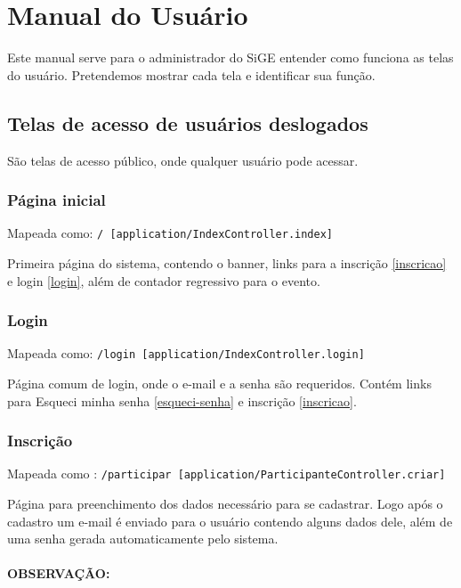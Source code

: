 \section{Manual do Usuário}

Este manual serve para o administrador do SiGE entender como funciona as
telas do usuário. Pretendemos mostrar cada tela e identificar sua
função.

\subsection{Telas de acesso de usuários deslogados}

São telas de acesso público, onde qualquer usuário pode acessar.

\subsubsection{Página inicial \label{home}}

Mapeada como: \texttt{/ {[}application/IndexController.index{]}}

Primeira página do sistema, contendo o banner, links para a inscrição
\ref{inscricao} e login \ref{login}, além de contador regressivo para o
evento.

\subsubsection{Login \label{login}}

Mapeada como: \texttt{/login {[}application/IndexController.login{]}}

Página comum de login, onde o e-mail e a senha são requeridos. Contém
links para Esqueci minha senha \ref{esqueci-senha} e inscrição
\ref{inscricao}.

\subsubsection{Inscrição \label{inscricao}}

Mapeada como :
\texttt{/participar {[}application/ParticipanteController.criar{]}}

Página para preenchimento dos dados necessário para se cadastrar. Logo
após o cadastro um e-mail é enviado para o usuário contendo alguns dados
dele, além de uma senha gerada automaticamente pelo sistema.

\paragraph{OBSERVAÇÃO:}

